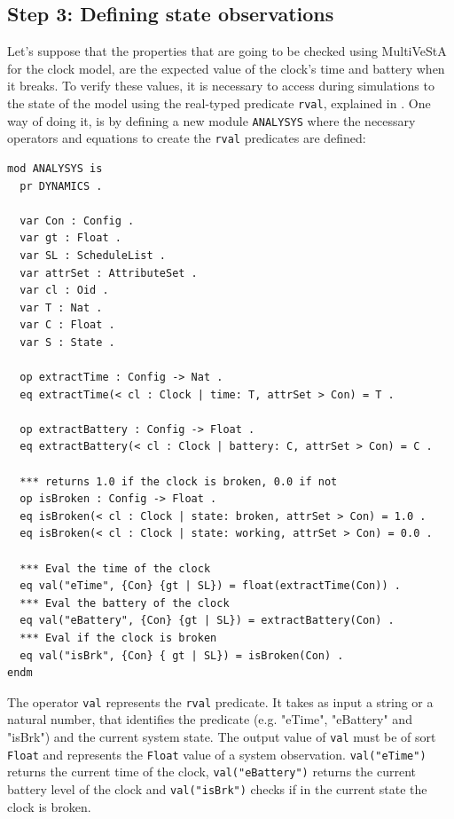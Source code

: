\subsection{Step 3: Defining state observations}
Let's suppose that the properties that are going to be checked using MultiVeStA for the clock model, are the expected value of the clock's time and battery when it breaks. To verify these values, it is necessary to access during simulations to the state of the model using the real-typed predicate \texttt{rval}, explained in \cite{multivesta}. One way of doing it, is by defining a new module \texttt{ANALYSYS} where the necessary operators and equations to create the \texttt{rval} predicates are defined:
\begin{lstlisting}
mod ANALYSYS is
  pr DYNAMICS .
  
  var Con : Config .
  var gt : Float .
  var SL : ScheduleList .
  var attrSet : AttributeSet .
  var cl : Oid .
  var T : Nat .
  var C : Float .
  var S : State .

  op extractTime : Config -> Nat .
  eq extractTime(< cl : Clock | time: T, attrSet > Con) = T .

  op extractBattery : Config -> Float .
  eq extractBattery(< cl : Clock | battery: C, attrSet > Con) = C .

  *** returns 1.0 if the clock is broken, 0.0 if not
  op isBroken : Config -> Float .
  eq isBroken(< cl : Clock | state: broken, attrSet > Con) = 1.0 .
  eq isBroken(< cl : Clock | state: working, attrSet > Con) = 0.0 .

  *** Eval the time of the clock
  eq val("eTime", {Con} {gt | SL}) = float(extractTime(Con)) .
  *** Eval the battery of the clock
  eq val("eBattery", {Con} {gt | SL}) = extractBattery(Con) .
  *** Eval if the clock is broken
  eq val("isBrk", {Con} { gt | SL}) = isBroken(Con) .
endm
\end{lstlisting}
The operator \texttt{val} represents the \texttt{rval} predicate. It takes as input a string or a natural number, that identifies the predicate (e.g. "eTime", "eBattery" and "isBrk") and the current system state. The output value of \texttt{val} must be of sort \texttt{Float} and represents the \texttt{Float} value of a system observation. \texttt{val("eTime")} returns the current time of the clock, \texttt{val("eBattery")} returns the current battery level of the clock and \texttt{val("isBrk")} checks if in the current state the clock is broken. 

